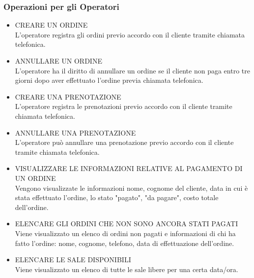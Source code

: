 \documentclass{article}
\newcounter{counteroperazioni}
\newcommand{\coperazioni}{\addtocounter{counteroperazioni}{1}\thecounteroperazioni}
\begin{document}
\subsubsection{Operazioni per gli Operatori}
\begin{itemize}[labelindent=1.5em,labelsep=.5cm,leftmargin=*]
    \item [\textbf{O\coperazioni)}] CREARE UN ORDINE \\ L'operatore registra gli ordini previo accordo con il cliente tramite chiamata telefonica.
    \item [\textbf{O\coperazioni)}] ANNULLARE UN ORDINE \\ L'operatore ha il diritto di annullare un ordine se il cliente non paga entro tre giorni dopo aver effettuato l'ordine previa chiamata telefonica.
    \item [\textbf{O\coperazioni)}] CREARE UNA PRENOTAZIONE \\ L'operatore registra le prenotazioni previo accordo con il cliente tramite chiamata telefonica.
    \item [\textbf{O\coperazioni)}] ANNULLARE UNA PRENOTAZIONE \\ L'operatore può annullare una prenotazione previo accordo con il cliente tramite chiamata telefonica.
    \item [\textbf{O\coperazioni)}] VISUALIZZARE LE INFORMAZIONI RELATIVE AL PAGAMENTO DI UN ORDINE \\ Vengono visualizzate le informazioni nome, cognome del cliente, data in cui è stata effettuato l'ordine, lo stato "pagato", "da pagare", costo totale dell'ordine. 
    \item [\textbf{O\coperazioni)}] ELENCARE GLI ORDINI CHE NON SONO ANCORA STATI PAGATI \\ Viene visualizzato un elenco di ordini non pagati e informazioni di chi ha fatto l'ordine: nome, cognome, telefono, data di effettuazione dell'ordine.
    \item [\textbf{O\coperazioni)}] ELENCARE LE SALE DISPONIBILI \\ Viene visualizzato un elenco di tutte le sale libere per una certa data/ora.
\end{itemize}
\end{document}
